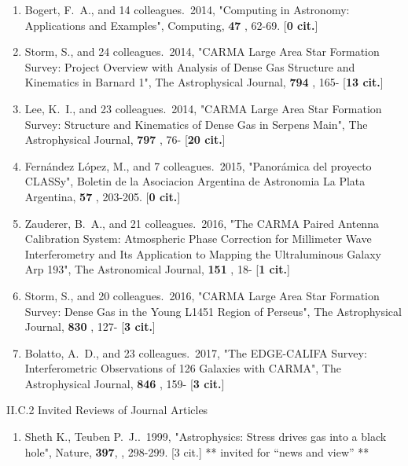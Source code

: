 \documentclass[11pt,letterpaper]{article}
\begin{document}
\begin{enumerate}[resume,label=\textbf{\arabic*}.]
\item  
Bogert, F.~A., and 14 colleagues.\  2014,  "Computing in Astronomy: 
Applications and Examples", Computing,  {\bf 47} , 62-69.  [{\bf 0 cit.}] 

\item  
Storm, S., and 24 colleagues.\  2014,  "CARMA Large Area Star Formation 
Survey: Project Overview with Analysis of Dense Gas Structure and 
Kinematics in Barnard 1", The Astrophysical Journal,  {\bf 794} , 165- 
[{\bf 13 cit.}] 

\item  
Lee, K.~I., and 23 colleagues.\  2014,  "CARMA Large Area Star Formation 
Survey: Structure and Kinematics of Dense Gas in Serpens Main", The 
Astrophysical Journal,  {\bf 797} , 76- [{\bf 20 cit.}] 

\item  
Fern{\'a}ndez L{\'o}pez, M., and 7 colleagues.\  2015,  "Panor{\'a}mica del 
proyecto CLASSy", Boletin de la Asociacion Argentina de Astronomia La Plata 
Argentina,  {\bf 57} , 203-205.  [{\bf 0 cit.}] 

\item  
Zauderer, B.~A., and 21 colleagues.\  2016,  "The CARMA Paired Antenna 
Calibration System: Atmospheric Phase Correction for Millimeter Wave 
Interferometry and Its Application to Mapping the Ultraluminous Galaxy Arp 
193", The Astronomical Journal,  {\bf 151} , 18- [{\bf 1 cit.}] 

\item  
Storm, S., and 20 colleagues.\  2016,  "CARMA Large Area Star Formation 
Survey: Dense Gas in the Young L1451 Region of Perseus", The Astrophysical 
Journal,  {\bf 830} , 127- [{\bf 3 cit.}] 

\item  
Bolatto, A.~D., and 23 colleagues.\  2017,  "The EDGE-CALIFA Survey: 
Interferometric Observations of 126 Galaxies with CARMA", The Astrophysical 
Journal,  {\bf 846} , 159- [{\bf 3 cit.}] 




 



\end{enumerate}


II.C.2  Invited Reviews of Journal Articles


\begin{enumerate}[resume,label=\textbf{\arabic*}.]
\item Sheth K., Teuben P.~J..\  1999,  "Astrophysics:  Stress drives gas 
into a black hole", Nature,  {\bf 397}, , 298-299.  [3 cit.] %
** invited for ``news and view'' **

\end{enumerate}
\end{document}
